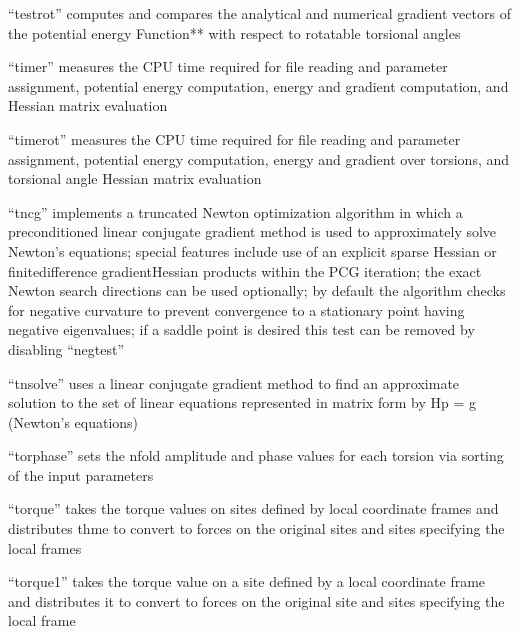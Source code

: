 \documentclass[letterpaper,11pt,english]{sphinxmanual}
\begin{document}

“testrot” computes and compares the analytical and numerical gradient vectors of the potential energy Function** with respect to rotatable torsional angles


“timer” measures the CPU time required for file reading and parameter assignment, potential energy computation, energy and gradient computation, and Hessian matrix evaluation


“timerot” measures the CPU time required for file reading and parameter assignment, potential energy computation, energy and gradient over torsions, and torsional angle Hessian matrix evaluation


“tncg” implements a truncated Newton optimization algorithm in which a preconditioned linear conjugate gradient method is used to approximately solve Newton’s equations; special features include use of an explicit sparse Hessian or finite\sphinxhyphen{}difference gradient\sphinxhyphen{}Hessian products within the PCG iteration; the exact Newton search directions can be used optionally; by default the algorithm checks for negative curvature to prevent convergence to a stationary point having negative eigenvalues; if a saddle point is desired this test can be removed by disabling “negtest”


“tnsolve” uses a linear conjugate gradient method to find an approximate solution to the set of linear equations represented in matrix form by Hp = \sphinxhyphen{}g (Newton’s equations)


“torphase” sets the n\sphinxhyphen{}fold amplitude and phase values for each torsion via sorting of the input parameters


“torque” takes the torque values on sites defined by local coordinate frames and distributes thme to convert to forces on the original sites and sites specifying the local frames


“torque1” takes the torque value on a site defined by a local coordinate frame and distributes it to convert to forces on the original site and sites specifying the local frame
\end{document}
